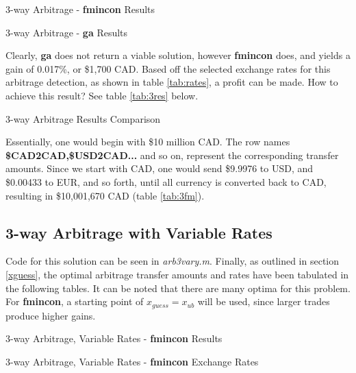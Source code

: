 \documentclass[12pt]{article}
\begin{document}
\begin{table}[H]
    \centering
    
    \caption{3-way Arbitrage - \textbf{fmincon} Results}
    \label{tab:3fm}
\end{table}

\begin{table}[H]
    \centering
    
    \caption{3-way Arbitrage - \textbf{ga} Results}
    \label{tab:3ga}
\end{table}
Clearly, \textbf{ga} does not return a viable solution, however \textbf{fmincon} does, and yields a gain of 0.017\%, or \$1,700 CAD. Based off the selected exchange rates for this arbitrage detection, as shown in table \ref{tab:rates}, a profit can be made. How to achieve this result? See table \ref{tab:3res} below.
\begin{table}[H]
    \centering
    
    \caption{3-way Arbitrage Results Comparison}
    \label{tab:3res}
\end{table}
Essentially, one would begin with \$10 million CAD. The row names \textbf{\$CAD2CAD,\$USD2CAD...} and so on, represent the corresponding transfer amounts. Since we start with CAD, one would send \$9.9976 to USD, and \$0.00433 to EUR, and so forth, until all currency is converted back to CAD, resulting in \$10,001,670 CAD (table \ref{tab:3fm}).

\subsection{3-way Arbitrage with Variable Rates}
Code for this solution can be seen in \textit{arb3vary.m}. Finally, as outlined in section \ref{xguess}, the optimal arbitrage transfer amounts and rates have been tabulated in the following tables. It can be noted that there are many optima for this problem. For \textbf{fmincon}, a starting point of $x_{guess} = x_{ub}$ will be used, since larger trades produce higher gains.

\begin{table}[H]
    \centering
    
    \caption{3-way Arbitrage, Variable Rates - \textbf{fmincon} Results}
    \label{tab:3fmv}
\end{table}

\begin{table}[H]
    \centering
    
    \caption{3-way Arbitrage, Variable Rates - \textbf{fmincon} Exchange Rates}
    \label{tab:3fmrv}
\end{table}
\end{document}

